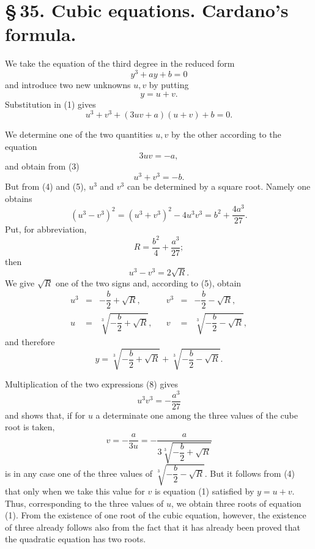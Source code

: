 \documentclass[11pt]{article}
\begin{document}
\section*{\S\,35. Cubic equations. Cardano's formula.}

We take the equation of the third degree in the reduced form
\begin{equation}
y^3+ay+b=0
\tag{1}
\end{equation}
and introduce two new unknowns $u,v$ by putting
\begin{equation}
y=u+v.
\tag{2}
\end{equation}
Substitution in (1) gives
\begin{equation}
u^3+v^3+(3uv+a)(u+v)+b=0.
\tag{3}
\end{equation}

We determine one of the two quantities $u,v$ by the other according to the equation
\begin{equation}
3uv=-a,
\tag{4}
\end{equation}
and obtain from (3)
\begin{equation}
u^3+v^3=-b.
\tag{5}
\end{equation}
But from (4) and (5), $u^3$ and $v^3$ can be determined by a square root. Namely one obtains
\begin{equation}
(u^3-v^3)^2=(u^3+v^3)^2-4u^3v^3
=b^2+\frac{4a^3}{27}.
\tag{6}
\end{equation}
Put, for abbreviation,
\begin{equation}
R=\frac{b^2}{4}+\frac{a^3}{27};
\tag{7}
\end{equation}
then
\[
 u^3-v^3=2\sqrt R.
\]
We give $\sqrt R$ one of the two signs and, according to (5), obtain
\begin{equation}
\begin{array}{rclcrcl}
u^3&=&-\dfrac b2+\sqrt R,&& v^3&=&-\dfrac b2-\sqrt R,\\[0.75em]
u&=&\sqrt[3]{-\dfrac b2+\sqrt R},&& v&=&\sqrt[3]{-\dfrac b2-\sqrt R},
\end{array}
\tag{8}
\end{equation}
and therefore
\begin{equation}
y=\sqrt[3]{-\frac b2+\sqrt R}+\sqrt[3]{-\frac b2-\sqrt R}.
\tag{9}
\end{equation}

Multiplication of the two expressions (8) gives
\[
 u^3v^3=-\frac{a^3}{27}
\]
and shows that, if for $u$ a determinate one among the three values of the cube root is taken,
\begin{equation}
v=-\frac{a}{3u}=-\frac{a}{3\sqrt[3]{-\dfrac b2+\sqrt R}}
\tag{10}
\end{equation}
is in any case one of the three values of $\sqrt[3]{-\dfrac b2-\sqrt R}$. But it follows from (4) that only when we take this value for $v$ is equation (1) satisfied by $y=u+v$. Thus, corresponding to the three values of $u$, we obtain three roots of equation (1). From the existence of one root of the cubic equation, however, the existence of three already follows also from the fact that it has already been proved that the quadratic equation has two roots.
\end{document}
